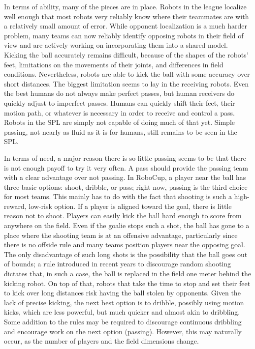 \documentclass{llncs}
\begin{document}
In terms of ability, many of the pieces are in place. Robots in the league localize
well enough that most robots very reliably know where their teammates are
with a relatively small amount of error. While opponent localization is a much
harder problem, many teams can now reliably identify opposing robots in their field
of view and are actively working on incorporating them into a shared model.
Kicking the ball accurately remains difficult,
because of the shapes of the robots' feet, limitations on the movements of their joints, and differences in field conditions. Nevertheless, robots are able to kick
the ball with some accuracy over short distances. The biggest limitation seems to
lay in the receiving robots. Even the best humans do not always make perfect passes,
but human receivers do quickly adjust to imperfect passes. Humans can quickly
shift their feet, their motion path, or whatever is necessary in order to receive and
control a pass. Robots in the SPL are simply not capable of doing much
of that yet. Simple passing, not  nearly as fluid as it
is for humans, still remains to be seen in the SPL.

In terms of need, a major reason there is so little passing seems to be that there is not enough payoff
to try it very often. A pass should provide the passing team with a clear advantage over
not passing. In RoboCup, a player near the ball has three basic options: shoot, dribble,
or pass; right now, passing is the third choice for most teams. This mainly has
to do with the fact that shooting is such a high-reward, low-risk option.
If a player is aligned toward the goal, there is little reason not to shoot. Players
can easily kick the ball hard enough to score from anywhere on the field. Even if the
goalie stops such a shot, the ball has gone to a place where the shooting team is at an
offensive advantage, particularly since there is no offside rule and many teams
position players near the opposing goal. The only disadvantage of such long shots is
the possibility that the ball goes out of bounds; a rule introduced in recent years to discourage random shooting dictates that, in such a case, the ball is replaced in the field one meter behind the kicking robot. On top of that, robots that take the time to stop and set their feet to kick over long distances risk having the
ball stolen by opponents. Given the lack of precise kicking, the next best option is to dribble, possibly using motion kicks, which are less powerful, but much quicker and almost akin to dribbling. 
Some addition to the rules may be required to discourage continuous dribbling and encourage work on the next option (passing). However, this may naturally occur, as the number of players and the field dimensions change. 
\end{document}
